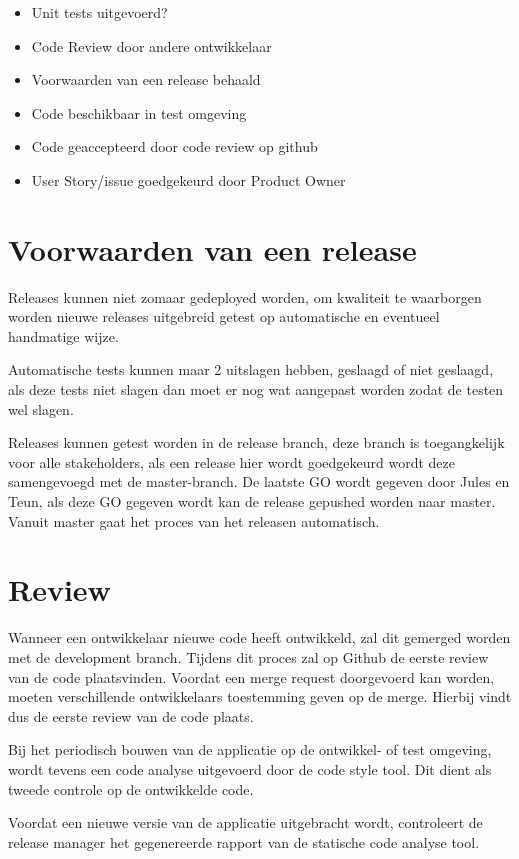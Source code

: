 	\begin{itemize}
			\item Unit tests uitgevoerd?
			\item Code Review door andere ontwikkelaar
			\item Voorwaarden van een release behaald
			\item Code beschikbaar in test omgeving
			\item Code geaccepteerd door code review op github
			\item User Story/issue goedgekeurd door Product Owner		
	\end{itemize}

\section{Voorwaarden van een release}
\label{sec:voorwaarden}
Releases kunnen niet zomaar gedeployed worden, om kwaliteit te waarborgen worden nieuwe releases uitgebreid getest op automatische en eventueel handmatige wijze.

Automatische tests kunnen maar 2 uitslagen hebben, geslaagd of niet geslaagd, als deze tests niet slagen dan moet er nog wat aangepast worden zodat de testen wel slagen.

Releases kunnen getest worden in de release branch, deze branch is toegangkelijk voor alle stakeholders, als een release hier wordt goedgekeurd wordt deze samengevoegd met de master-branch.
De laatste GO wordt gegeven door Jules en Teun, als deze GO gegeven wordt kan de release gepushed worden naar master.
Vanuit master gaat het proces van het releasen automatisch.

\section{Review}
Wanneer een ontwikkelaar nieuwe code heeft ontwikkeld, zal dit gemerged worden met de development branch. Tijdens dit proces zal op Github de eerste review van de code plaatsvinden. Voordat een merge request doorgevoerd kan worden, moeten verschillende ontwikkelaars toestemming geven op de merge. Hierbij vindt dus de eerste review van de code plaats.

Bij het periodisch bouwen van de applicatie op de ontwikkel- of test omgeving, wordt tevens een code analyse uitgevoerd door de code style tool. Dit dient als tweede controle op de ontwikkelde code.

Voordat een nieuwe versie van de applicatie uitgebracht wordt, controleert de release manager het gegenereerde rapport van de statische code analyse tool.

